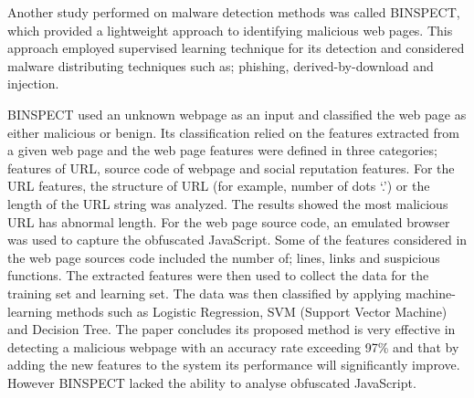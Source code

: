 Another study performed on malware detection methods was called BINSPECT, which provided a lightweight approach to identifying malicious web pages. This approach employed supervised learning technique for its detection and considered malware distributing techniques such as; phishing, derived-by-download and injection\cite{eshete2012binspect}.

BINSPECT used an unknown webpage as an input and classified the web page as either malicious or benign. Its classification relied on the features extracted from a given web page and the web page features were defined in three categories; features of URL, source code of webpage and social reputation features. 
For the URL features, the structure of URL (for example, number of dots ‘.’) or the length of the URL string was analyzed. The results showed the most malicious URL has abnormal length. For the web page source code, an emulated browser was used to capture the obfuscated JavaScript. Some of the features considered in the web page sources code included the number of; lines, links and suspicious functions. The extracted features were then used to collect the data for the training set and learning set. The data was then classified by applying machine-learning methods such as Logistic Regression, SVM (Support Vector Machine) and Decision Tree\cite{eshete2012binspect}.
The paper concludes its proposed method is very effective in detecting a malicious webpage with an accuracy rate exceeding 97\% and that by adding the new features to the system its performance will significantly improve. However BINSPECT lacked the ability to analyse obfuscated JavaScript\cite{eshete2012binspect}. 
